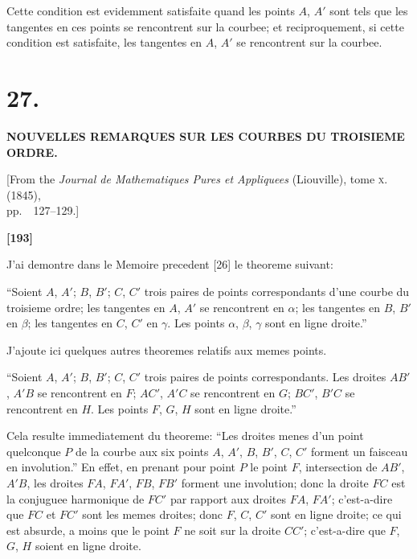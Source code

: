 \documentclass[11pt,a4paper]{article}
\begin{document}
Cette condition est evidemment satisfaite quand les points $A$, $A'$ sont tels que les
tangentes en ces points se rencontrent sur la courbee; et reciproquement, si cette
condition est satisfaite, les tangentes en $A$, $A'$ se rencontrent sur la courbee.


\newpage
\section*{27.}

\begin{center}
\textbf{NOUVELLES REMARQUES SUR LES COURBES DU TROISIEME ORDRE.}
\end{center}

\begin{center}
[From the \textit{Journal de Mathematiques Pures et Appliquees} (Liouville), tome \textsc{x}. (1845),\\
pp.~~127--129.]
\end{center}


\textbf{[193]}

J'ai demontre dans le Memoire precedent [26] le theoreme suivant:

``Soient $A$, $A'$; $B$, $B'$; $C$, $C'$ trois paires de points correspondants d'une courbe
du troisieme ordre; les tangentes en $A$, $A'$ se rencontrent en $\alpha$; les tangentes en $B$, $B'$ en
$\beta$; les tangentes en $C$, $C'$ en $\gamma$. Les points $\alpha$, $\beta$, $\gamma$ sont en ligne droite.''

J'ajoute ici quelques autres theoremes relatifs aux memes points.

``Soient $A$, $A'$; $B$, $B'$; $C$, $C'$ trois paires de points correspondants. Les droites
$AB'$, $A'B$ se rencontrent en $F$; $AC'$, $A'C$ se rencontrent en $G$; $BC'$, $B'C$ se rencontrent
en $H$. Les points $F$, $G$, $H$ sont en ligne droite.''

Cela resulte immediatement du theoreme: ``Les droites menes d'un point
quelconque $P$ de la courbe aux six points $A$, $A'$, $B$, $B'$, $C$, $C'$ forment un faisceau en
involution.'' En effet, en prenant pour point $P$ le point $F$, intersection de $AB'$, $A'B$,
les droites $FA$, $FA'$, $FB$, $FB'$ forment une involution; donc la droite $FC$ est la
conjuguee harmonique de $FC'$ par rapport aux droites $FA$, $FA'$; c'est-a-dire que
$FC$ et $FC'$ sont les memes droites; donc $F$, $C$, $C'$ sont en ligne droite; ce qui est
absurde, a moins que le point $F$ ne soit sur la droite $CC'$; c'est-a-dire que $F$, $G$, $H$
soient en ligne droite.
\end{document}
